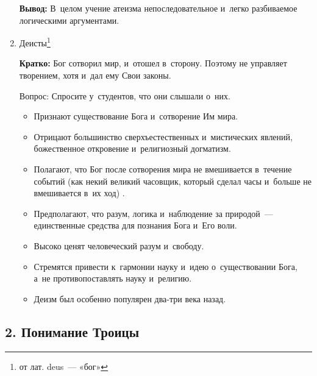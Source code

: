 \documentclass[a4paper,12pt]{article}
\begin{document}
\begin{enumerate}
\textbf{Вывод:} В~целом учение атеизма непоследовательное и~легко разбиваемое логическими аргументами.

    \item Деисты\footnote{от лат. deus~--- «бог»} 
    
    \textbf{Кратко:} Бог сотворил мир, и~отошел в~сторону. Поэтому не управляет творением, хотя и~дал ему Свои законы. 
    
    Вопрос: Спросите у~студентов, что они слышали о~них.
    \begin{itemize}
        \item Признают существование Бога и~сотворение Им мира.
        \item Отрицают большинство сверхъестественных и~мистических явлений, божественное откровение и~религиозный догматизм.
        \item Полагают, что Бог после сотворения мира не вмешивается в~течение событий (как некий великий часовщик, который сделал часы и~больше не вмешивается в~их ход) .
        \item Предполагают, что разум, логика и~наблюдение за природой~--- единственные средства для познания Бога и~Его воли. 
        \item Высоко ценят человеческий разум и~свободу. 
        \item Стремятся привести к~гармонии науку и~идею о~существовании Бога, а~не противопоставлять науку и~религию.
        \item Деизм был особенно популярен два-три века назад.
    \end{itemize}

\end{enumerate}

        
\subsection{2. Понимание Троицы}        
            
\end{document}
